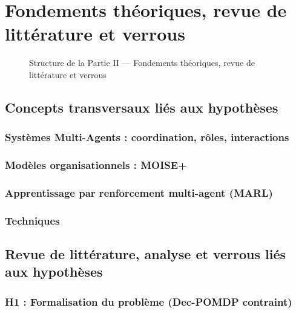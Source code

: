 \documentclass[ twoside,openright,titlepage,numbers=noenddot,headinclude,%
                footinclude=true,cleardoublepage=empty,abstractoff, %
                BCOR=5mm,paper=a4,fontsize=11pt,%
                french,american,%
                ]{scrreprt}
\begin{document}

\part{Fondements théoriques, revue de littérature et verrous}

\begin{figure}[h!]
    \centering
    
    \caption{Structure de la Partie II — Fondements théoriques, revue de littérature et verrous}
\end{figure}

\chapter{Concepts transversaux liés aux hypothèses}

\section{Systèmes Multi-Agents : coordination, rôles, interactions}
\section{Modèles organisationnels : MOISE+}

\section{Apprentissage par renforcement multi-agent (MARL)}

\section{Techniques }

\chapter{Revue de littérature, analyse et verrous liés aux hypothèses}

\section{H1 : Formalisation du problème (Dec-POMDP contraint)}
\end{document}
